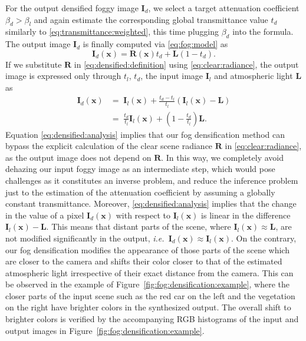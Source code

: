 \documentclass[twocolumn]{svjour3}          \smartqed  \usepackage{graphicx}
\newcommand{\ie}{\mbox{\emph{i.e.\ }}}
\begin{document}
For the output densified foggy image $\mathbf{I}_d$, we select a target attenuation coefficient $\beta_d > \beta_l$ and again estimate the corresponding global transmittance value $t_d$ similarly to \eqref{eq:transmittance:weighted}, this time plugging $\beta_d$ into the formula. The output image $\mathbf{I}_d$ is finally computed via \eqref{eq:fog:model} as
\begin{equation} \label{eq:densified:definition}
\mathbf{I}_d(\mathbf{x}) = \mathbf{R}(\mathbf{x})t_d + \mathbf{L}\left(1 - t_d\right).
\end{equation}
If we substitute $\mathbf{R}$ in \eqref{eq:densified:definition} using \eqref{eq:clear:radiance}, the output image is expressed only through $t_l$, $t_d$, the input image $\mathbf{I}_l$ and atmospheric light $\mathbf{L}$ as
\begin{align}
\mathbf{I}_d(\mathbf{x}) &{=}\;\mathbf{I}_l(\mathbf{x}) + \frac{t_d - t_l}{t_l}\left(\mathbf{I}_l(\mathbf{x}) - \mathbf{L}\right) \nonumber\\
&{=}\;\frac{t_d}{t_l}\mathbf{I}_l(\mathbf{x}) + \left(1 - \frac{t_d}{t_l}\right)\mathbf{L}. \label{eq:densified:analysis}
\end{align}
Equation \eqref{eq:densified:analysis} implies that our fog densification method can bypass the explicit calculation of the clear scene radiance $\mathbf{R}$ in \eqref{eq:clear:radiance}, as the output image does not depend on $\mathbf{R}$. In this way, we completely avoid dehazing our input foggy image as an intermediate step, which would pose challenges as it constitutes an inverse problem, and reduce the inference problem just to the estimation of the attenuation coefficient by assuming a globally constant transmittance. Moreover, \eqref{eq:densified:analysis} implies that the change in the value of a pixel $\mathbf{I}_d(\mathbf{x})$ with respect to $\mathbf{I}_l(\mathbf{x})$ is linear in the difference $\mathbf{I}_l(\mathbf{x}) - \mathbf{L}$. This means that distant parts of the scene, where $\mathbf{I}_l(\mathbf{x}) \approx \mathbf{L}$, are not modified significantly in the output, \ie{}$\mathbf{I}_d(\mathbf{x}) \approx \mathbf{I}_l(\mathbf{x})$. On the contrary, our fog densification modifies the appearance of those parts of the scene which are closer to the camera and shifts their color closer to that of the estimated atmospheric light irrespective of their exact distance from the camera. This can be observed in the example of Figure~\ref{fig:fog:densification:example}, where the closer parts of the input scene such as the red car on the left and the vegetation on the right have brighter colors in the synthesized output. The overall shift to brighter colors is verified by the accompanying RGB histograms of the input and output images in Figure~\ref{fig:fog:densification:example}.
\end{document}
